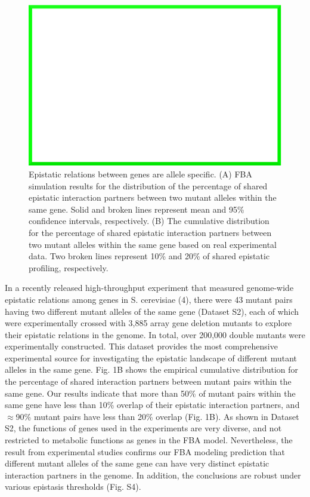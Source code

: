\begin{figure}
\centering
\includegraphics[width=\textwidth]{dummy}
\caption{Epistatic relations between genes are allele specific. (A)
FBA simulation results for the distribution of the percentage of
shared epistatic interaction partners between two mutant alleles
within the same gene. Solid and broken lines represent mean and 95\%
confidence intervals, respectively. (B) The cumulative distribution
for the percentage of shared epistatic interaction partners between
two mutant alleles within the same gene based on real experimental
data. Two broken lines represent 10\% and 20\% of shared epistatic
profiling, respectively.}
\label{fig:alleleSpecific}
\end{figure}

In a recently released high-throughput experiment that measured
genome-wide epistatic relations among genes in S. cerevisiae (4),
there were 43 mutant pairs having two different mutant alleles of the
same gene (Dataset S2), each of which were experimentally crossed with
3,885 array gene deletion mutants to explore their epistatic relations
in the genome. In total, over 200,000 double mutants were
experimentally constructed. This dataset provides the most
comprehensive experimental source for investigating the epistatic
landscape of different mutant alleles in the same gene. Fig. 1B shows
the empirical cumulative distribution for the percentage of shared
interaction partners between mutant pairs within the same gene. Our
results indicate that more than 50\% of mutant pairs within the same
gene have less than 10\% overlap of their epistatic interaction
partners, and $\approx$90\% mutant pairs have less than 20\% overlap
(Fig. 1B). As shown in Dataset S2, the functions of genes used in the
experiments are very diverse, and not restricted to metabolic
functions as genes in the FBA model. Nevertheless, the result from
experimental studies confirms our FBA modeling prediction that
different mutant alleles of the same gene can have very distinct
epistatic interaction partners in the genome. In addition, the
conclusions are robust under various epistasis thresholds (Fig. S4).

